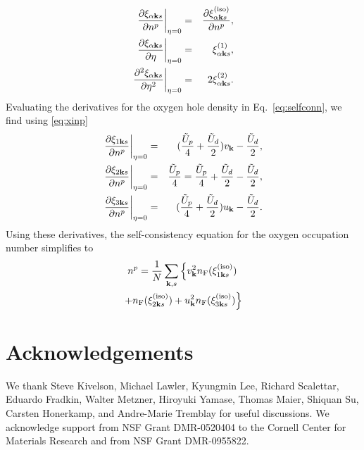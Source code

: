 \documentclass[prb, twocolumn,showpacs,preprintnumbers,amsmath,amssymb, floatfix]{revtex4}
\begin{document}
\begin{eqnarray}
  \left.\frac{\partial \xi_{\alpha {\bf k} s}}{\partial n^p}\right|_{\eta=0} &=& \frac{\partial \xi_{\alpha {\bf k} s}^{({\rm iso})}}{\partial n^p}\label{eq:xinp},\\
  \left.\frac{\partial \xi_{\alpha {\bf k} s}}{\partial \eta}\right|_{\eta=0} &=& \xi_{\alpha {\bf k} s}^{(1)}\label{eq:xieta},\\
  \left.\frac{\partial^2 \xi_{\alpha {\bf k} s}}{\partial \eta^2}\right|_{\eta=0} &=& 2 \xi_{\alpha {\bf k} s}^{(2)}\label{eq:xietaeta}.
\end{eqnarray}
Evaluating the derivatives for the oxygen hole density in Eq.~\eqref{eq:selfconn}, we find using
\eqref{eq:xinp}
\begin{eqnarray}
  \left.\frac{\partial \xi_{1 {\bf k} s}}{\partial n^p}\right|_{\eta=0} &=& (\frac{\tilde{U}_{p}}{4} + \frac{\tilde{U}_{d}}{2}) v_{{\bf k}} - \frac{\tilde{U}_{d}}{2},\\
  \left.\frac{\partial \xi_{2 {\bf k} s}}{\partial n^p}\right|_{\eta=0} &=& \frac{\tilde{U}_{p}}{4} = \frac{\tilde{U}_{p}}{4} + \frac{\tilde{U}_{d}}{2} - \frac{\tilde{U}_{d}}{2},\\
  \left.\frac{\partial \xi_{3 {\bf k} s}}{\partial n^p}\right|_{\eta=0} &=& (\frac{\tilde{U}_{p}}{4} + \frac{\tilde{U}_{d}}{2}) u_{{\bf k}} - \frac{\tilde{U}_{d}}{2}.
  \label{eq:explicitxinp}
\end{eqnarray}
Using these derivatives, the self-consistency equation for the oxygen occupation number simplifies to
\begin{multline}
  n^p = \frac{1}{N}\sum_{{\bf k}, s}\left\{v_{{\bf k}}^2n_{\rm F}(\xi_{1{\bf k} s}^{({\rm iso})})\right.\\
  \left.+ n_{\rm F}(\xi_{2{\bf k} s}^{({\rm iso})}) + u_{{\bf k}}^2 n_{\rm F}(\xi_{3{\bf k} s}^{({\rm iso})})\right\}
  \label{eq:appnpeta0}
\end{multline}

\section*{Acknowledgements}
We thank Steve Kivelson, Michael Lawler, Kyungmin Lee, Richard
Scalettar, Eduardo Fradkin, Walter Metzner, Hiroyuki Yamase, Thomas
Maier, Shiquan Su, Carsten Honerkamp, and Andre-Marie Tremblay for useful discussions.
We acknowledge support from NSF Grant DMR-0520404 to the Cornell Center for Materials Research and from NSF Grant DMR-0955822.
\end{document}
